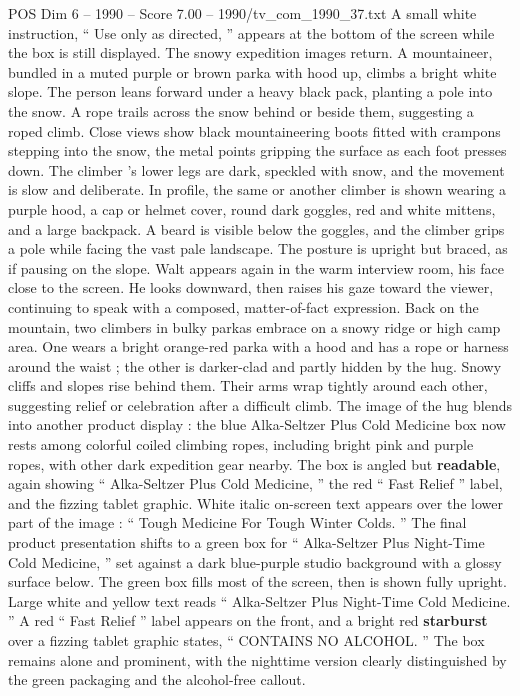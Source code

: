 \begin{textsample}{POS Dim 6 – 1990 – Score 7.00 – 1990/tv\_com\_1990\_37.txt}
A small white instruction, “ Use only as directed, ” appears at the bottom of the screen while the box is still displayed.
The snowy expedition images return.
A mountaineer, bundled in a muted purple or brown parka with hood up, climbs a bright white slope.
The person leans forward under a heavy black pack, planting a pole into the snow.
A rope trails across the snow behind or beside them, suggesting a roped climb.
Close views show black mountaineering boots fitted with crampons stepping into the snow, the metal points gripping the surface as each foot presses down.
The climber ’s lower legs are dark, speckled with snow, and the movement is slow and deliberate.
In profile, the same or another climber is shown wearing a purple hood, a cap or helmet cover, round dark goggles, red and white mittens, and a large backpack.
A beard is visible below the goggles, and the climber grips a pole while facing the vast pale landscape.
The posture is upright but braced, as if pausing on the slope.
Walt appears again in the warm interview room, his face close to the screen.
He looks downward, then raises his gaze toward the viewer, continuing to speak with a composed, matter-of-fact expression.
Back on the mountain, two climbers in bulky parkas embrace on a snowy ridge or high camp area.
One wears a bright orange-red parka with a hood and has a rope or harness around the waist ; the other is darker-clad and partly hidden by the hug.
Snowy cliffs and slopes rise behind them.
Their arms wrap tightly around each other, suggesting relief or celebration after a difficult climb.
The image of the hug blends into another product display : the blue Alka-Seltzer Plus Cold Medicine box now rests among colorful coiled climbing ropes, including bright pink and purple ropes, with other dark expedition gear nearby.
The box is angled but \textbf{readable}, again showing “ Alka-Seltzer Plus Cold Medicine, ” the red “ Fast Relief ” label, and the fizzing tablet graphic.
White italic on-screen text appears over the lower part of the image : “ Tough Medicine For Tough Winter Colds. ” The final product presentation shifts to a green box for “ Alka-Seltzer Plus Night-Time Cold Medicine, ” set against a dark blue-purple studio background with a glossy surface below.
The green box fills most of the screen, then is shown fully upright.
Large white and yellow text reads “ Alka-Seltzer Plus Night-Time Cold Medicine. ” A red “ Fast Relief ” label appears on the front, and a bright red \textbf{starburst} over a fizzing tablet graphic states, “ CONTAINS NO ALCOHOL. ” The box remains alone and prominent, with the nighttime version clearly distinguished by the green packaging and the alcohol-free callout.

\end{textsample}
